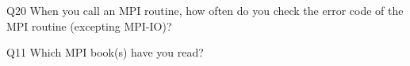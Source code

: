 \begin{description}%
\item{Q20} When you call an MPI routine, how often do you check the error code of the MPI routine  (excepting MPI-IO)?%
\item{Q11} Which MPI book(s) have you read?%
\end{description}%
